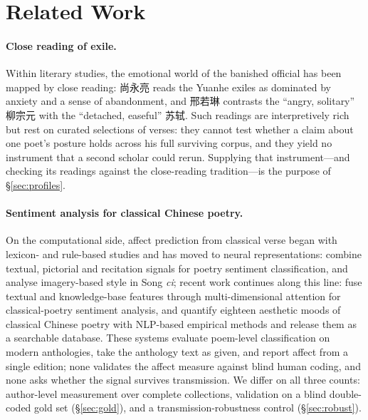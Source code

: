 \documentclass[10pt]{article}
\begin{document}
\section{Related Work}
\label{sec:related}
\paragraph{Close reading of exile.} Within literary studies, the emotional world of the
banished official has been mapped by close reading: 尚永亮 \citep{shang2007exiled}
reads the Yuanhe exiles as dominated by anxiety and a sense of abandonment, and
邢若琳 \citep{xing2024liusu} contrasts the ``angry, solitary'' 柳宗元 with the
``detached, easeful'' 苏轼. Such readings are interpretively rich but rest on curated
selections of verses: they cannot test whether a claim about one poet's posture holds
across his full surviving corpus, and they yield no instrument that a second scholar
could rerun. Supplying that instrument---and checking its readings against the
close-reading tradition---is the purpose of \S\ref{sec:profiles}.

\paragraph{Sentiment analysis for classical Chinese poetry.} On the computational
side, affect prediction from classical verse began with lexicon- and rule-based
studies \citep{hou2015sentiment} and has moved to neural representations:
\citet{du2025multimodal} combine textual, pictorial and recitation signals for poetry
sentiment classification, and \citet{fang2011cld} analyse imagery-based style in Song
\emph{ci}; recent work continues along this line: \citet{liu2025samcap} fuse textual
and knowledge-base features through multi-dimensional attention for classical-poetry
sentiment analysis, and \citet{qin2025shades} quantify eighteen aesthetic moods of
classical Chinese poetry with NLP-based empirical methods and release them as a
searchable database. These systems evaluate poem-level classification on modern
anthologies, take the anthology text as given, and report affect from a single
edition; none validates the affect measure against blind human coding, and none asks
whether the signal survives transmission. We differ on all three counts: author-level
measurement over complete collections, validation on a blind double-coded gold set
(\S\ref{sec:gold}), and a transmission-robustness control (\S\ref{sec:robust}).
\end{document}
